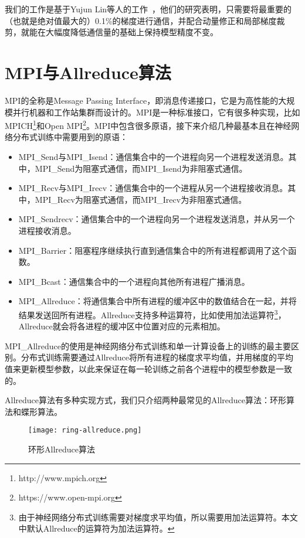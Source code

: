 我们的工作是基于Yujun Lin等人的工作~\cite{lin2017deep}，他们的研究表明，只需要将最重要的（也就是绝对值最大的）0.1\%的梯度进行通信，并配合动量修正和局部梯度裁剪，就能在大幅度降低通信量的基础上保持模型精度不变。

\section{MPI与Allreduce算法}
\label{section:MPI-Allreduce}
MPI的全称是Message Passing Interface，即消息传递接口，它是为高性能的大规模并行机器和工作站集群而设计的。MPI是一种标准接口，它有很多种实现，比如MPICH\footnote{http://www.mpich.org}和Open MPI\footnote{https://www.open-mpi.org}。MPI中包含很多原语，接下来介绍几种最基本且在神经网络分布式训练中需要用到的原语：
\begin{itemize}
    \item MPI\_Send与MPI\_Isend：通信集合中的一个进程向另一个进程发送消息。其中，MPI\_Send为阻塞式通信，而MPI\_Isend为非阻塞式通信。
    \item MPI\_Recv与MPI\_Irecv：通信集合中的一个进程从另一个进程接收消息。其中，MPI\_Recv为阻塞式通信，而MPI\_Irecv为非阻塞式通信。
    \item MPI\_Sendrecv：通信集合中的一个进程向另一个进程发送消息，并从另一个进程接收消息。
    \item MPI\_Barrier：阻塞程序继续执行直到通信集合中的所有进程都调用了这个函数。
    \item MPI\_Bcast：通信集合中的一个进程向其他所有进程广播消息。
    \item MPI\_Allreduce：将通信集合中所有进程的缓冲区中的数值结合在一起，并将结果发送回所有进程。Allreduce支持多种运算符，比如使用加法运算符\footnote{由于神经网络分布式训练需要对梯度求平均值，所以需要用加法运算符。本文中默认Allreduce的运算符为加法运算符。}，Allreduce就会将各进程的缓冲区中位置对应的元素相加。
\end{itemize}

MPI\_Allreduce的使用是神经网络分布式训练和单一计算设备上的训练的最主要区别。分布式训练需要通过Allreduce将所有进程的梯度求平均值，并用梯度的平均值来更新模型参数，以此来保证在每一轮训练之前各个进程中的模型参数是一致的。

Allreduce算法有多种实现方式，我们只介绍两种最常见的Allreduce算法：环形算法和蝶形算法。


\begin{figure}[ht] %
    \centering
    \texttt{[image: ring-allreduce.png]}
    \caption{环形Allreduce算法}
    \label{fig:ring-allreduce}
\end{figure}

